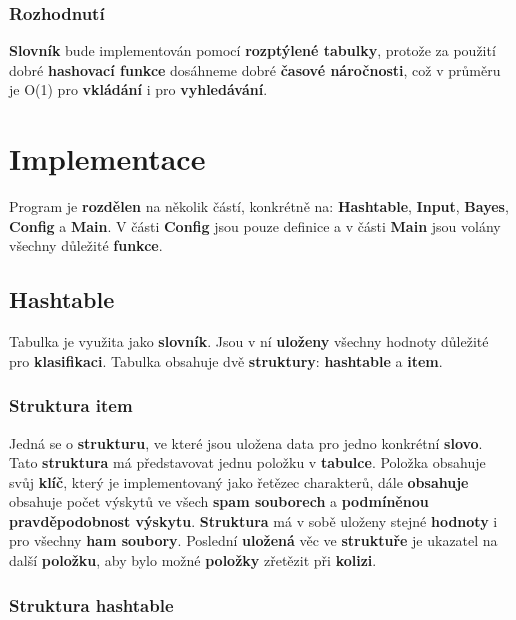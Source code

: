 \documentclass[12pt]{report}
\begin{document}
		\subsection{Rozhodnutí}
		
		\textbf{Slovník} bude implementován pomocí \textbf{rozptýlené tabulky}, protože za použití dobré \textbf{hashovací funkce} dosáhneme dobré \textbf{časové náročnosti}, což v průměru je O(1) pro \textbf{vkládání} i pro \textbf{vyhledávání}.
		
		

	\chapter{Implementace}
	
	Program je \textbf{rozdělen} na několik částí, konkrétně na: \textbf{Hashtable}, \textbf{Input}, \textbf{Bayes}, \textbf{Config} a \textbf{Main}. V části \textbf{Config} jsou pouze definice a v části \textbf{Main} jsou volány všechny důležité \textbf{funkce}.
	
	
	\section{Hashtable}
	
	Tabulka je využita jako \textbf{slovník}. Jsou v ní \textbf{uloženy} všechny hodnoty důležité pro \textbf{klasifikaci}. Tabulka obsahuje dvě \textbf{struktury}: \textbf{hashtable} a \textbf{item}.
	
		\subsection{Struktura item}
		
			Jedná se o \textbf{strukturu}, ve které jsou uložena data pro jedno konkrétní \textbf{slovo}. Tato \textbf{struktura} má představovat jednu položku v \textbf{tabulce}.
			Položka obsahuje svůj \textbf{klíč}, který je implementovaný jako řetězec charakterů, dále \textbf{obsahuje} obsahuje počet výskytů ve všech \textbf{spam souborech} a \textbf{podmíněnou pravděpodobnost výskytu}. \textbf{Struktura} má v sobě uloženy stejné \textbf{hodnoty} i pro všechny \textbf{ham soubory}. Poslední \textbf{uložená} věc ve \textbf{struktuře} je ukazatel na další \textbf{položku}, aby bylo možné \textbf{položky} zřetězit při \textbf{kolizi}.
				
		\subsection{Struktura hashtable}
		
\end{document}
